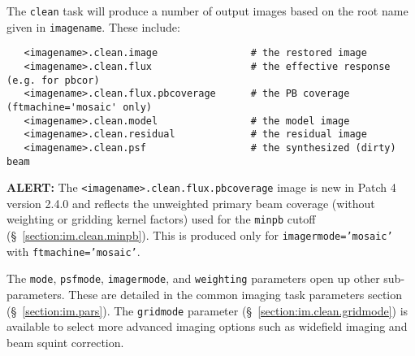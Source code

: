 The {\tt clean} task will produce a number of output images based
on the root name given in {\tt imagename}.  
These include:
\small
\begin{verbatim}
   <imagename>.clean.image                # the restored image
   <imagename>.clean.flux                 # the effective response (e.g. for pbcor)
   <imagename>.clean.flux.pbcoverage      # the PB coverage (ftmachine='mosaic' only)
   <imagename>.clean.model                # the model image
   <imagename>.clean.residual             # the residual image
   <imagename>.clean.psf                  # the synthesized (dirty) beam
\end{verbatim}
\normalsize
{\bf ALERT:} The {\tt <imagename>.clean.flux.pbcoverage} image is
new in Patch 4 version 2.4.0 and reflects the unweighted primary beam
coverage (without weighting or gridding kernel factors) used for
the {\tt minpb} cutoff (\S~\ref{section:im.clean.minpb}).  This is
produced only for {\tt imagermode='mosaic'} with {\tt ftmachine='mosaic'}.

The {\tt mode}, {\tt psfmode}, {\tt imagermode}, and {\tt weighting}
parameters open up other sub-parameters.  These are detailed
in the common imaging task parameters section
(\S~\ref{section:im.pars}).  The {\tt gridmode} parameter
(\S~\ref{section:im.clean.gridmode}) is available to select more
advanced imaging options such as widefield imaging and beam squint
correction.

